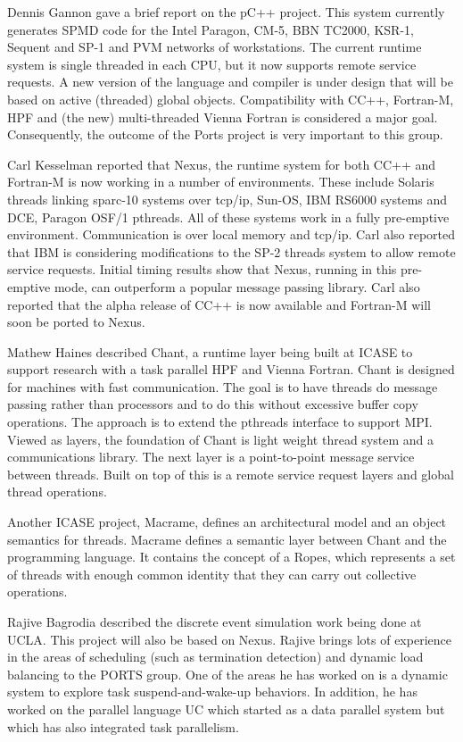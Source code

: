 Dennis Gannon gave a brief report on the pC++ project.  This
system currently generates SPMD code for the Intel Paragon, CM-5,
BBN TC2000, KSR-1, Sequent and SP-1 and PVM networks of workstations.
The current runtime system is single threaded in each CPU, but it now supports
remote service requests.  A new version of the language and compiler
is under design that will be based on active (threaded) global objects.
Compatibility with CC++, Fortran-M, HPF and
(the new) multi-threaded Vienna Fortran is considered a major
goal.  Consequently, the outcome of the Ports project is very
important to this group.

Carl Kesselman reported that Nexus, the runtime system for both
CC++ and Fortran-M is now working in a number of environments.
These include Solaris threads linking sparc-10 systems over tcp/ip,
Sun-OS, IBM RS6000 systems and DCE, Paragon OSF/1 pthreads.
All of these systems work in a fully pre-emptive environment.
Communication is over local memory and tcp/ip.  Carl also reported
that IBM is considering modifications to the SP-2 threads system
to allow remote service requests.  Initial timing results show
that Nexus, running in this pre-emptive mode, can outperform
a popular message passing library.
Carl also reported that the alpha release of CC++ is now
available and Fortran-M will soon be ported to Nexus.

Mathew Haines described Chant, a runtime layer being built at
ICASE to support research with a task parallel HPF and Vienna
Fortran.  Chant is designed for machines with fast communication.
The goal is to have threads do message passing rather than processors
and to do this without excessive buffer copy operations.
The approach is to extend the pthreads interface to support MPI.
Viewed as layers, the foundation of Chant is light weight thread
system and a communications library.  The next layer is
a point-to-point message service between threads.  Built on
top of this is a remote service request layers and global thread
operations.  

Another ICASE project, Macrame, defines an architectural model and
an object semantics for threads. Macrame defines a semantic
layer between Chant and the programming language.
It contains the concept of a Ropes, which represents
a set of threads with enough common identity that they can carry
out collective operations.

Rajive Bagrodia described the discrete event simulation work
being done at UCLA.  This project will also be based on Nexus.
Rajive brings lots of experience in the areas of scheduling 
(such as termination detection) and
dynamic load balancing to the PORTS group. 
One of the areas he has worked on is a dynamic system to explore
task suspend-and-wake-up behaviors.  In addition, he has worked
on the parallel language UC which started as a data parallel system
but which has also integrated task parallelism.
        

